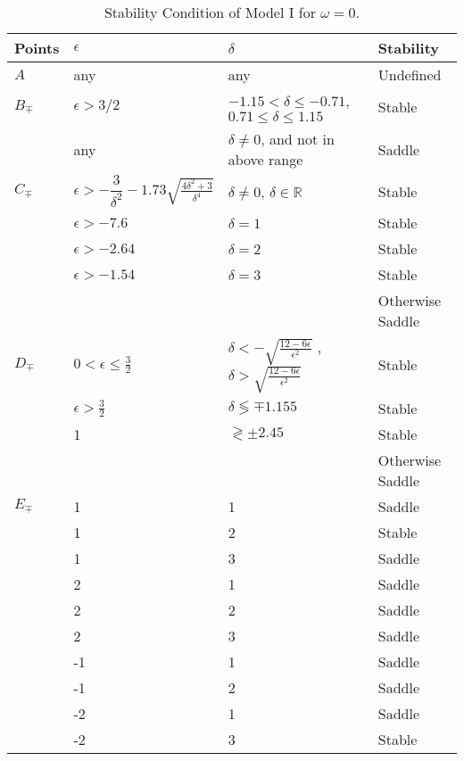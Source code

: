 \documentclass[a4paper,12pt]{article}
\begin{document}
\begin{table}[h!]
\begin{tabular} {|p{1cm} |p{3cm}| p{6cm}| p{4cm}| }
\hline
Points & $\epsilon$ & $\delta$ & Stability \\
\hline 
$ A  $ & any & any & Undefined \\
\hline 
$ B_{\mp} $ & $\epsilon > 3/2$ & $ -1.15<\delta \leq -0.71 $,\newline  $ 0.71 \le \delta \le 1.15 $ & Stable \\
\cline{2-4} 
& any & $ \delta  \ne 0 $, and 	not in above range & Saddle \\
\hline 
$ C_{\mp} $ & $ \epsilon >-\dfrac{3}{\delta ^2}-1.73 \sqrt{\frac{4 \delta ^2+3}{\delta ^4}} $ & $\delta \ne 0$, $\delta \in \mathbb{R}$ & Stable \\
\cline{2-4}
& $\epsilon > -7.6$ & $\delta = 1$ & Stable \\
& $\epsilon > -2.64$  & $ \delta = 2  $ & Stable
\\
& 	$\epsilon > -1.54$ & $ \delta = 3  $ & Stable
\\
& &  & Otherwise Saddle \\
\hline 
$ D_{\mp} $ & $ 0<\epsilon \leq \frac{3}{2} $ &$  \delta <-\sqrt{\frac{12-6 \epsilon }{\epsilon ^2}} $ , $ \delta >\sqrt{\frac{12-6 \epsilon }{\epsilon ^2}} $ & Stable \\
\cline{2-4}
& $ \epsilon >\frac{3}{2} $ & $ \delta \lessgtr\mp1.155 $ & Stable \\
\cline{2-4}
& 1& $ \gtrless \pm2.45 $ & Stable \\
&  &  & Otherwise  Saddle \\
\hline 
$ E_{\mp} $ & 1 & 1&  Saddle  \\ 
\cline{2-4}
& 1 & 2 & Stable\\ 
\cline{2-4}
& 1 & 3 & Saddle \\
\cline{2-4}
& 2 & 1 & Saddle \\
\cline{2-4}
& 2 & 2 & Saddle \\
\cline{2-4}
& 2 & 3 & Saddle \\
\cline{2-4}
& -1 & 1& Saddle \\
\cline{2-4}
& -1 & 2& Saddle \\
\cline{2-4}		
& -2 & 1 & Saddle\\
\cline{2-4}	
& -2 & 3& Stable \\
\hline 
\end{tabular}
\caption{Stability Condition of Model I for $\omega = 0$.}
\label{Model 01 : Stability}
\end{table}
\end{document}
